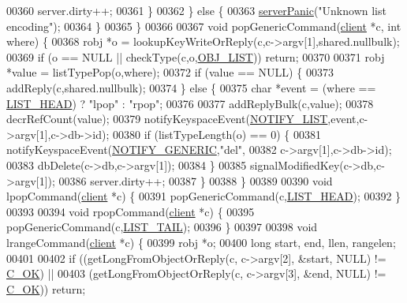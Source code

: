 \begin{DoxyCode}
00360             server.dirty++;
00361         \}
00362     \} \textcolor{keywordflow}{else} \{
00363         \hyperlink{server_8h_a11cc378e7778a830b41240578de3b204}{serverPanic}(\textcolor{stringliteral}{"Unknown list encoding"});
00364     \}
00365 \}
00366 
00367 \textcolor{keywordtype}{void} popGenericCommand(\hyperlink{structclient}{client} *c, \textcolor{keywordtype}{int} where) \{
00368     robj *o = lookupKeyWriteOrReply(c,c->argv[1],shared.nullbulk);
00369     \textcolor{keywordflow}{if} (o == NULL || checkType(c,o,\hyperlink{server_8h_a4a5f22a280949c97a0cb0d4213275126}{OBJ\_LIST})) \textcolor{keywordflow}{return};
00370 
00371     robj *value = listTypePop(o,where);
00372     \textcolor{keywordflow}{if} (value == NULL) \{
00373         addReply(c,shared.nullbulk);
00374     \} \textcolor{keywordflow}{else} \{
00375         \textcolor{keywordtype}{char} *event = (where == \hyperlink{server_8h_a5fc6a15ca26c6208f66ad2768a3108ef}{LIST\_HEAD}) ? \textcolor{stringliteral}{"lpop"} : \textcolor{stringliteral}{"rpop"};
00376 
00377         addReplyBulk(c,value);
00378         decrRefCount(value);
00379         notifyKeyspaceEvent(\hyperlink{server_8h_a1c0b64c84b0e66dff3554ffe3e2ec4c8}{NOTIFY\_LIST},event,c->argv[1],c->db->id);
00380         \textcolor{keywordflow}{if} (listTypeLength(o) == 0) \{
00381             notifyKeyspaceEvent(\hyperlink{server_8h_a9fa53dd1068e62365f3964ad3479eec2}{NOTIFY\_GENERIC},\textcolor{stringliteral}{"del"},
00382                                 c->argv[1],c->db->id);
00383             dbDelete(c->db,c->argv[1]);
00384         \}
00385         signalModifiedKey(c->db,c->argv[1]);
00386         server.dirty++;
00387     \}
00388 \}
00389 
00390 \textcolor{keywordtype}{void} lpopCommand(\hyperlink{structclient}{client} *c) \{
00391     popGenericCommand(c,\hyperlink{server_8h_a5fc6a15ca26c6208f66ad2768a3108ef}{LIST\_HEAD});
00392 \}
00393 
00394 \textcolor{keywordtype}{void} rpopCommand(\hyperlink{structclient}{client} *c) \{
00395     popGenericCommand(c,\hyperlink{server_8h_a745de98bef5b645df56479181803235b}{LIST\_TAIL});
00396 \}
00397 
00398 \textcolor{keywordtype}{void} lrangeCommand(\hyperlink{structclient}{client} *c) \{
00399     robj *o;
00400     \textcolor{keywordtype}{long} start, end, llen, rangelen;
00401 
00402     \textcolor{keywordflow}{if} ((getLongFromObjectOrReply(c, c->argv[2], &start, NULL) != \hyperlink{server_8h_a303769ef1065076e68731584e758d3e1}{C\_OK}) ||
00403         (getLongFromObjectOrReply(c, c->argv[3], &end, NULL) != \hyperlink{server_8h_a303769ef1065076e68731584e758d3e1}{C\_OK})) \textcolor{keywordflow}{return};

\end{DoxyCode}
